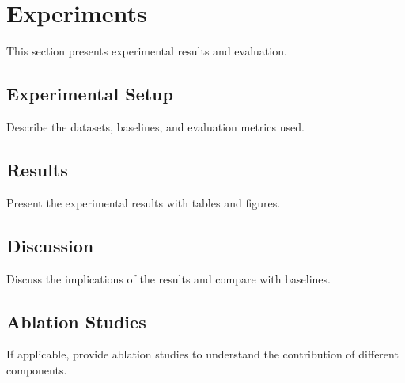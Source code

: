 \section{Experiments}
\label{sec:expr}

This section presents experimental results and evaluation.

\subsection{Experimental Setup}
Describe the datasets, baselines, and evaluation metrics used.

\subsection{Results}
Present the experimental results with tables and figures.

\subsection{Discussion}
Discuss the implications of the results and compare with baselines.

\subsection{Ablation Studies}
If applicable, provide ablation studies to understand the contribution of different components.
